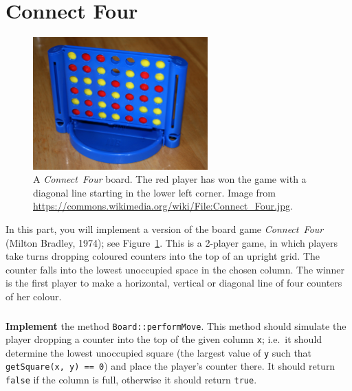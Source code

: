 \part{Connect Four}

\begin{figure}
    \begin{center}
        \includegraphics[width=0.6\textwidth]{connect_4.jpg}
    \end{center}
    \caption{A \emph{Connect~Four} board.
        The red player has won the game with a diagonal line starting in the lower left corner.
        Image from \protect\url{https://commons.wikimedia.org/wiki/File:Connect_Four.jpg}.}
    \label{fig:connect_4}
\end{figure}

In this part, you will implement a version of the board game \emph{Connect~Four} (Milton Bradley, 1974); see Figure~\ref{fig:connect_4}.
This is a 2-player game, in which players take turns dropping coloured counters into the top of an upright grid.
The counter falls into the lowest unoccupied space in the chosen column.
The winner is the first player to make a horizontal, vertical or diagonal line of four counters of her colour.

\section{} \label{core-b-first}

\textbf{Implement} the method \lstinline{Board::performMove}.
This method should simulate the player dropping a counter into the top of the given column \lstinline{x};
i.e.\ it should determine the lowest unoccupied square
(the largest value of \lstinline{y} such that \lstinline{getSquare(x, y) == 0})
and place the player's counter there.
It should return \lstinline{false} if the column is full, otherwise it should return \lstinline{true}.

\section{}

